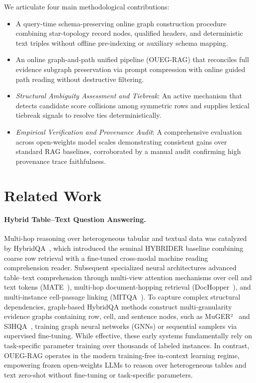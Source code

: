 \documentclass[runningheads]{llncs}
\begin{document}
We articulate four main methodological contributions:
\begin{itemize}
    \item A query-time schema-preserving online graph construction procedure combining star-topology record nodes, qualified headers, and deterministic text triples without offline pre-indexing or auxiliary schema mapping.
    \item An online graph-and-path unified pipeline (OUEG-RAG) that reconciles full evidence subgraph preservation via prompt compression with online guided path reading without destructive filtering.
    \item \emph{Structural Ambiguity Assessment and Tiebreak}: An active mechanism that detects candidate score collisions among symmetric rows and supplies lexical tiebreak signals to resolve ties deterministically.
    \item \emph{Empirical Verification and Provenance Audit}: A comprehensive evaluation across open-weights model scales demonstrating consistent gains over standard RAG baselines, corroborated by a manual audit confirming high provenance trace faithfulness.
\end{itemize}

\section{Related Work}
\label{sec:related}



\paragraph{Hybrid Table--Text Question Answering.}
Multi-hop reasoning over heterogeneous tabular and textual data was catalyzed by HybridQA~\cite{hybridqa}, which introduced the seminal HYBRIDER baseline combining coarse row retrieval with a fine-tuned cross-modal machine reading comprehension reader. Subsequent specialized neural architectures advanced table--text comprehension through multi-view attention mechanisms over cell and text tokens (MATE~\cite{eisenschlos2021mate}), multi-hop document-hopping retrieval (DocHopper~\cite{sun2021dochopper}), and multi-instance cell-passage linking (MITQA~\cite{kumar2021mitqa}). To capture complex structural dependencies, graph-based HybridQA methods construct multi-granularity evidence graphs containing row, cell, and sentence nodes, such as MuGER²~\cite{chen2022muger2} and S3HQA~\cite{lei2023s3hqa}, training graph neural networks (GNNs) or sequential samplers via supervised fine-tuning. While effective, these early systems fundamentally rely on task-specific parameter training over thousands of labeled instances. In contrast, OUEG-RAG operates in the modern training-free in-context learning regime, empowering frozen open-weights LLMs to reason over heterogeneous tables and text zero-shot without fine-tuning or task-specific parameters.
\end{document}
